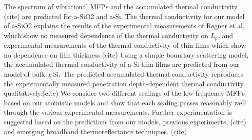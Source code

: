 \documentclass[aps,prb,onecolumn,preprint,superscriptaddress,footinbib,amsmath,amssymb,floatfix]{revtex4}
\begin{document}
The spectrum of vibrational MFPs and the accumulated thermal conductivity
(cite) 
are predicted for a-SiO2 and a-Si. The thermal conductivity for our model 
of a-SiO2 explains the results of the experimental measurements 
of Regner et al, which show no measured dependence of the thermal 
conductivity on $L_p$,\cite{regner_broadband_2013} and experimental 
measurements of the thermal conductivity of thin films which 
show no dependence on film thickness.(cite) 
Using a simple boundary scattering model, the accumulated thermal 
conductivity of a-Si thin films are predicted from our model 
of bulk a-Si. The predicted accumulated thermal conductivity 
reproduces the experimentally measured penetration depth-dependent 
thermal conductivity qualitatively.(cite) We consider two different 
scalings of the low-frequency MFPs based on our atomistic models 
and show that each scaling passes reasonably well through the 
various experimental measurements.
\cite{liu_high_2009,yang_anomalously_2010} Further experimentation 
is suggested based on the predictions from our models, previous 
experiments,
(cite) 
and emerging broadband thermoreflectance techniques.
(cite)
\end{document}
